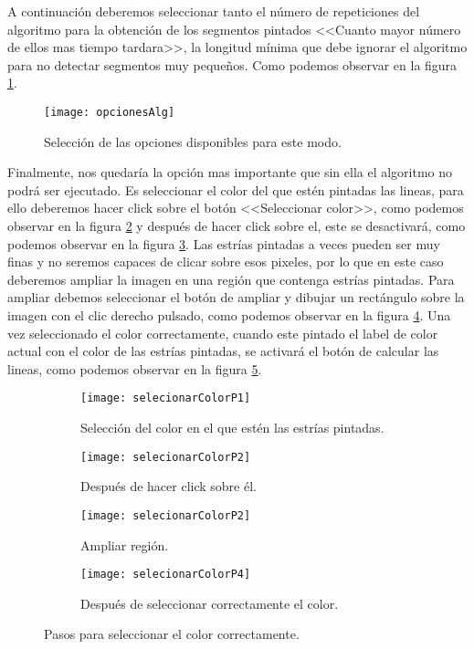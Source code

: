 A continuación deberemos seleccionar tanto el número de repeticiones del algoritmo para la obtención de los segmentos pintados <<Cuanto mayor número de ellos mas tiempo tardara>>, la longitud mínima que debe ignorar el algoritmo para no detectar segmentos muy pequeños. Como podemos observar en la figura \ref{fig:opcionesAlg}.

\begin{figure}[h]
\centering
\texttt{[image: opcionesAlg]}
\caption{Selección de las opciones disponibles para este modo.}
\label{fig:opcionesAlg}
\end{figure}

Finalmente, nos quedaría la opción mas importante que sin ella el algoritmo no podrá ser ejecutado. Es seleccionar el color del que estén pintadas las lineas, para ello deberemos hacer click sobre el botón <<Seleccionar color>>, como podemos observar en la figura \ref{fig:selecionarColorP1} y después de hacer click sobre el, este se desactivará, como podemos observar en la figura \ref{fig:selecionarColorP2}.
Las estrías pintadas a veces pueden ser muy finas y no seremos capaces de clicar sobre esos pixeles, por lo que en este caso deberemos ampliar la imagen en una región que contenga estrías pintadas. Para ampliar debemos seleccionar el botón de ampliar y dibujar un rectángulo sobre la imagen con el clic derecho pulsado, como podemos observar en la figura \ref{fig:selecionarColorP3}.
Una vez seleccionado el color correctamente, cuando este pintado el label de color actual con el color de las estrías pintadas, se activará el botón de calcular las lineas, como podemos observar en la figura \ref{fig:selecionarColorP4}.



\begin{figure}
	\begin{subfigure}[c]{.5\linewidth}
	\centering\large \texttt{[image: selecionarColorP1]}
	\caption{Selección del color en el que estén las estrías pintadas.}\label{fig:selecionarColorP1}
	\end{subfigure}%
	\begin{subfigure}[c]{.5\linewidth}
	\centering\large \texttt{[image: selecionarColorP2]}
	\caption{Después de hacer click sobre él.}
	\label{fig:selecionarColorP2}
	\end{subfigure}%
	
	\begin{subfigure}[c]{.5\linewidth}
	\centering\large \texttt{[image: selecionarColorP2]}
	\caption{Ampliar región.}
	\label{fig:selecionarColorP3}
	\end{subfigure}%
	\begin{subfigure}[c]{.5\linewidth}
	\centering\large \texttt{[image: selecionarColorP4]}
	\caption{Después de seleccionar correctamente el color.}
	\label{fig:selecionarColorP4}
	\end{subfigure}%
	\label{fig:pasosColor}
	\caption{Pasos para seleccionar el color correctamente.}
\end{figure}

